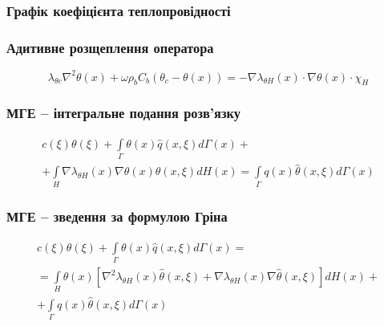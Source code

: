\documentclass{beamer}
\begin{document}
\begin{frame}
    \frametitle{Графік коефіцієнта теплопровідності}
    \begin{figure}[ht!]
        \centering
    \end{figure}
\end{frame}

\begin{frame}
    \frametitle{Адитивне розщеплення оператора}
    \begin{equation}
        \label{eqn:thermo_pennes_separation_eqn}
        \lambda_{\theta c} \nabla^2 \theta(x) + \omega \rho_b C_b (\theta_c - \theta(x)) =
        - \nabla \lambda_{\theta H} (x) \cdot \nabla \theta(x) \cdot \chi_H
    \end{equation}
\end{frame}

\begin{frame}
    \frametitle{МГЕ -- інтегральне подання розв'язку}
    \begin{equation}
        \label{eqn:thermo_bem_direct_pennes}
        \begin{split}
            c(\xi)\theta(\xi) + \int \limits_{\Gamma}\theta(x)\hat{q}(x,\xi)d\Gamma(x) + \\
            + \int \limits_{H} \nabla{\lambda_{\theta H}(x)}\nabla{\theta(x)} \hat{\theta}(x,\xi) d H(x)
            = \int \limits_{\Gamma}q(x)\hat{\theta}(x,\xi)d\Gamma(x)
        \end{split}
    \end{equation}
\end{frame}

\begin{frame}
    \frametitle{МГЕ -- зведення за формулою Гріна}
    \begin{equation}
        \label{eqn:thermo_bem_direct_pennes_simplified}
        \begin{split}
            c(\xi)\theta(\xi) + \int \limits_{\Gamma}\theta(x)\hat{q}(x,\xi)d\Gamma(x) = \\
            = \int \limits_{H}\theta(x) [ \nabla^2 \lambda_{\theta H}(x) \hat{\theta}(x,\xi) +
                \nabla \lambda_{\theta H}(x) \nabla \hat{\theta}(x,\xi) ] dH(x) + \\
            + \int \limits_{\Gamma}q(x)\hat{\theta}(x,\xi)d\Gamma(x)
        \end{split}
    \end{equation}
\end{frame}
\end{document}
